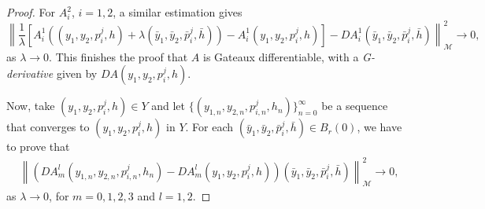 \documentclass[10pt,a4paper]{amsart}
\begin{document}
\begin{proof}
    For $A^2_i$, $i=1,2$, a similar estimation gives
    $$
        \left\| \frac{1}{\lambda}\left[ A^1_i (( y_1, y_2, p_i^j, h)+\lambda(\bar y_1,\bar y_2,\bar p_i^j,\bar h)) - A^1_i( y_1, y_2, p_i^j, h) \right] - D A^1_i(\bar y_1,\bar y_2,\bar p_i^j,\bar h) \right\|^{2}_{\mathcal{M}} \to 0,
    $$
    as $\lambda \to 0$. This finishes the proof that $A$ is Gateaux differentiable, with a \textit{G-derivative} given by $D A( y_1, y_2, p_i^j, h)$.
    
     Now, take $( y_1, y_2, p_i^j, h)\in Y$ and let $\{(y_{1,n},y_{2,n},p^{j}_{i,n},h_{n})\}_{n=0}^{\infty}$ be a sequence that converges to  $( y_1, y_2, p_i^j, h)$ in $Y$. For each $(\bar y_1,\bar y_2,\bar p_i^j,\bar h)\in B_{r}(0)$, we have to prove that 
    \begin{equation}\label{eq:continuity_DA_m_l}
    	\begin{split}
    		&\left\|(D A^l_m(y_{1,n},y_{2,n},p^{j}_{i,n},h_{n})-D A^l_m( y_1, y_2, p_i^j, h))(\bar y_1,\bar y_2,\bar p_i^j,\bar h) \right\|^{2}_{\mathcal{M}}\rightarrow 0,
    	\end{split}
    \end{equation}
    as $\lambda \to 0$, for $m=0,1,2,3$ and $l=1,2$.
    

\end{proof}
\end{document}
